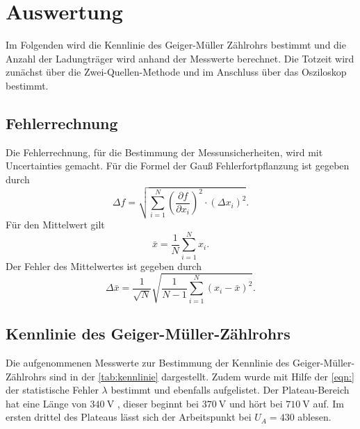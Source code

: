 \section{Auswertung}
\label{sec:auswertung}
Im Folgenden wird die Kennlinie des Geiger-Müller Zählrohrs bestimmt und 
die Anzahl der Ladungträger wird anhand der Messwerte berechnet. Die Totzeit wird zunächst über die Zwei-Quellen-Methode
und im Anschluss über das Osziloskop bestimmt.

\subsection{Fehlerrechnung}
\label{sec:Fehlerrechnung}
Die Fehlerrechnung, für die Bestimmung der Messunsicherheiten, wird mit Uncertainties \cite{uncertainties} gemacht.
Für die Formel der Gauß Fehlerfortpflanzung ist gegeben durch
\begin{equation}
    \Delta f=\sqrt{\sum_{i=1}^N\left(\frac{\partial f}{\partial x_i}\right)^2 \cdot\left(\Delta x_i\right)^2}.
    \label{eqn:gauss}
\end{equation}
Für den Mittelwert gilt 
\begin{equation}
    \bar{x} = \frac{1}{N}\sum\limits_{i = 1}^N x_i .
    \label{eqn:mittelwert}
\end{equation}
Der Fehler des Mittelwertes ist gegeben durch 
\begin{equation}
    \Delta \bar{x}=\frac{1}{\sqrt{N}} \sqrt{\frac{1}{N-1} \sum_{i=1}^N\left(x_i-\bar{x}\right)^2}.
    \label{eqn:mittelwertfehler}
\end{equation}

\subsection{Kennlinie des Geiger-Müller-Zählrohrs}
\label{sec:Kennlinie des Geiger-Müller-Zählrohrs}

Die aufgenommenen Messwerte zur Bestimmung der Kennlinie des Geiger-Müller-Zählrohrs sind in der \autoref{tab:kennlinie}
dargestellt. Zudem wurde mit Hilfe der \autoref{eqn:} der statistische Fehler $\lambda$ bestimmt und ebenfalls aufgelistet.
Der Plateau-Bereich hat eine Länge von $\SI{340}{\volt}$ , dieser beginnt bei $\SI{370}{\volt}$ und hört bei $\SI{710}{\volt}$ auf.
Im ersten drittel des Plateaus lässt sich der Arbeitspunkt bei $U_A = 430$ ablesen.

